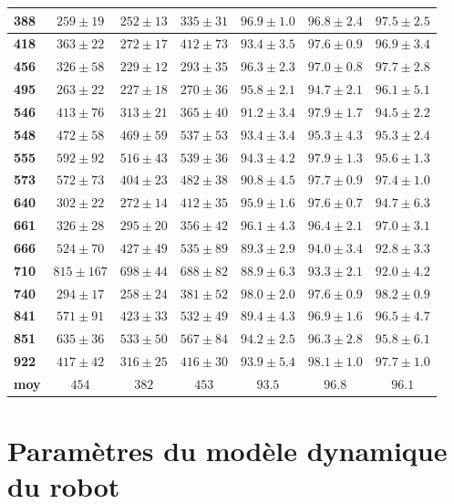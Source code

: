 \begin{appendices}
\begin{tabular}{|l|c|c|c|c|c|c|}
		\textbf{388}&$259 \pm 19$&$252 \pm 13$&$335 \pm 31$&$96.9 \pm 1.0$&$96.8 \pm 2.4$&$97.5 \pm 2.5$\\\hline
		\textbf{418}&$363 \pm 22$&$272 \pm 17$&$412 \pm 73$&$93.4 \pm 3.5$&$97.6 \pm 0.9$&$96.9 \pm 3.4$\\\hline
		\textbf{456}&$326 \pm 58$&$229 \pm 12$&$293 \pm 35$&$96.3 \pm 2.3$&$97.0 \pm 0.8$&$97.7 \pm 2.8$\\\hline
		\textbf{495}&$263 \pm 22$&$227 \pm 18$&$270 \pm 36$&$95.8 \pm 2.1$&$94.7 \pm 2.1$&$96.1 \pm 5.1$\\\hline
		\textbf{546}&$413 \pm 76$&$313 \pm 21$&$365 \pm 40$&$91.2 \pm 3.4$&$97.9 \pm 1.7$&$94.5 \pm 2.2$\\\hline
		\textbf{548}&$472 \pm 58$&$469 \pm 59$&$537 \pm 53$&$93.4 \pm 3.4$&$95.3 \pm 4.3$&$95.3 \pm 2.4$\\\hline
		\textbf{555}&$592 \pm 92$&$516 \pm 43$&$539 \pm 36$&$94.3 \pm 4.2$&$97.9 \pm 1.3$&$95.6 \pm 1.3$\\\hline
		\textbf{573}&$572 \pm 73$&$404 \pm 23$&$482 \pm 38$&$90.8 \pm 4.5$&$97.7 \pm 0.9$&$97.4 \pm 1.0$\\\hline
		\textbf{640}&$302 \pm 22$&$272 \pm 14$&$412 \pm 35$&$95.9 \pm 1.6$&$97.6 \pm 0.7$&$94.7 \pm 6.3$\\\hline
		\textbf{661}&$326 \pm 28$&$295 \pm 20$&$356 \pm 42$&$96.1 \pm 4.3$&$96.4 \pm 2.1$&$97.0 \pm 3.1$\\\hline
		\textbf{666}&$524 \pm 70$&$427 \pm 49$&$535 \pm 89$&$89.3 \pm 2.9$&$94.0 \pm 3.4$&$92.8 \pm 3.3$\\\hline
		\textbf{710}&$815 \pm 167$&$698 \pm 44$&$688 \pm 82$&$88.9 \pm 6.3$&$93.3 \pm 2.1$&$92.0 \pm 4.2$\\\hline
		\textbf{740}&$294 \pm 17$&$258 \pm 24$&$381 \pm 52$&$98.0 \pm 2.0$&$97.6 \pm 0.9$&$98.2 \pm 0.9$\\\hline
		\textbf{841}&$571 \pm 91$&$423 \pm 33$&$532 \pm 49$&$89.4 \pm 4.3$&$96.9 \pm 1.6$&$96.5 \pm 4.7$\\\hline
		\textbf{851}&$635 \pm 36$&$533 \pm 50$&$567 \pm 84$&$94.2 \pm 2.5$&$96.3 \pm 2.8$&$95.8 \pm 6.1$\\\hline
		\textbf{922}&$417 \pm 42$&$316 \pm 25$&$416 \pm 30$&$93.9 \pm 5.4$&$98.1 \pm 1.0$&$97.7 \pm 1.0$\\\hline
		\textbf{moy}&$454$&$382$&$453$&$93.5$&$96.8$&$96.1$\\\hline
	\end{tabular}
	
	\chapter{Paramètres du modèle dynamique du robot} \label{app_dynamic_param}
	

\end{appendices}
